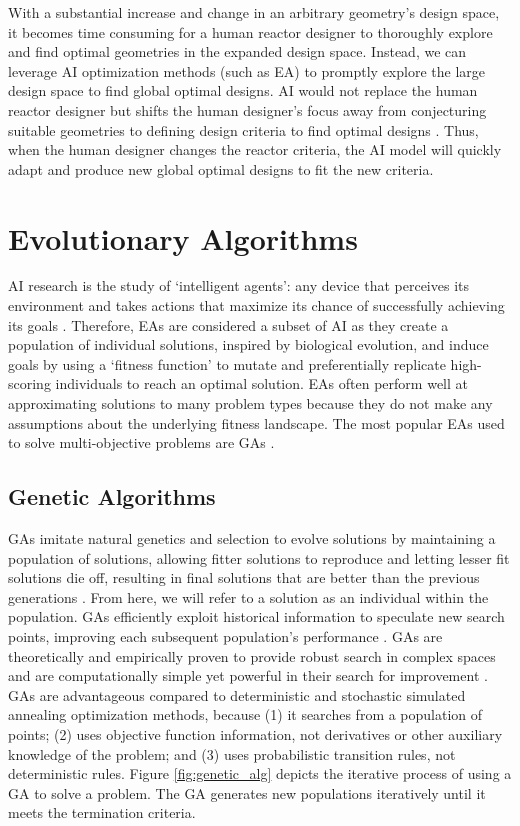 With a substantial increase and change in an arbitrary geometry's design space, 
it becomes time consuming for a human reactor designer to thoroughly explore 
and find optimal geometries in the expanded design space. 
Instead, we can leverage \gls{AI} optimization methods (such as \gls{EA}) to 
promptly explore the large design space to find global optimal designs. 
\gls{AI} would not replace the human reactor designer but shifts the human 
designer's focus away from conjecturing suitable geometries to defining design 
criteria to find optimal designs \cite{sobes_artificial_2020}. 
Thus, when the human designer changes the reactor criteria, the \gls{AI} 
model will quickly adapt and produce new global optimal designs to fit the new 
criteria.  

\section{Evolutionary Algorithms} 
\gls{AI} research is the study of `intelligent agents': any device that perceives 
its environment and takes actions that maximize its chance of successfully 
achieving its goals \cite{david_l_poole_computational_1998}.
Therefore, \glspl{EA} are considered a subset of \gls{AI} as they create a population 
of individual solutions, inspired by biological evolution, and induce goals by 
using a `fitness function' to mutate and preferentially replicate high-scoring 
individuals to reach an optimal solution.
\glspl{EA} often perform well at approximating solutions to many 
problem types because they do not make any assumptions about the 
underlying fitness landscape.
The most popular \glspl{EA} used to solve multi-objective problems are \glspl{GA} 
\cite{byrne_evolving_2014, krish_practical_2011}. 

\subsection{Genetic Algorithms}
\label{sec:genetic_alg}
\glspl{GA} imitate natural genetics and selection to evolve solutions 
by maintaining a population of solutions, allowing fitter solutions to reproduce
and letting lesser fit solutions die off, resulting in final solutions that are 
better than the previous generations \cite{renner_genetic_2003}. 
From here, we will refer to a solution as an individual within the population. 
\glspl{GA} efficiently exploit historical information to speculate new search 
points, improving each subsequent population's performance 
\cite{goldberg_genetic_1989}. 
\glspl{GA} are theoretically and empirically proven to provide robust 
search in complex spaces and are computationally simple yet powerful 
in their search for improvement \cite{goldberg_genetic_1989}. 
GAs are advantageous compared to deterministic and stochastic simulated 
annealing optimization methods, because (1) it searches from a population of 
points; (2) uses objective function information, not derivatives or other 
auxiliary knowledge of the problem; and (3) uses probabilistic transition 
rules, not deterministic rules. 
Figure \ref{fig:genetic_alg} depicts the iterative process of using a \gls{GA}
to solve a problem. 
The \gls{GA} generates new populations iteratively until it meets the termination 
criteria. 

